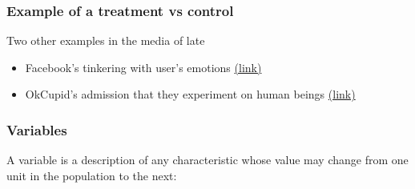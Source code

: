 \documentclass[handout]{beamer}
\newcommand{\blue}[1]{\textcolor{blue2}{#1}}
\begin{document}
\begin{frame}
\frametitle{Example of a treatment vs control}
Two other examples in the media of late
\begin{itemize}
\item Facebook's tinkering with user's emotions \blue{\href{http://www.nytimes.com/2014/06/30/technology/facebook-tinkers-with-users-emotions-in-news-feed-experiment-stirring-outcry.html}{(link)}}
\item OkCupid's admission that they experiment on human beings \blue{\href{http://blog.okcupid.com/index.php/we-experiment-on-human-beings/}{(link)}}
\end{itemize}

\end{frame}



\begin{frame}[fragile]
\frametitle{Variables}
A \blue{variable} is a description of any characteristic whose value may change from one unit in the population to the next:
\vspace{3in}

\end{frame}



%
\end{document}

